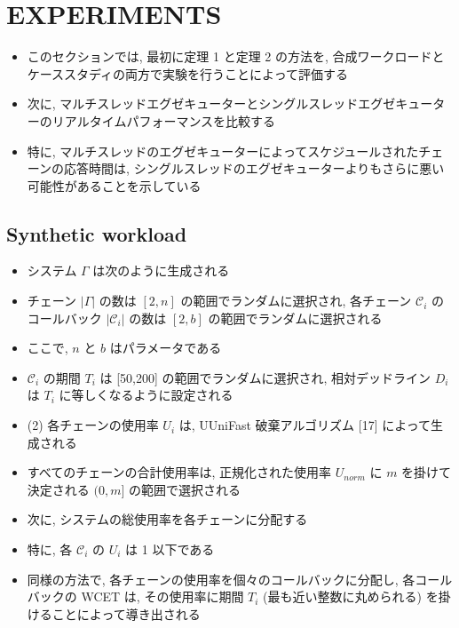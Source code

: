 
\section{EXPERIMENTS}
\label{sec: experiments}


\begin{frame}{}
    \begin{itemize}
        \item このセクションでは, 最初に定理 1 と定理 2 の方法を, 合成ワークロードとケーススタディの両方で実験を行うことによって評価する
\item 次に, マルチスレッドエグゼキューターとシングルスレッドエグゼキューターのリアルタイムパフォーマンスを比較する
\item 特に, マルチスレッドのエグゼキューターによってスケジュールされたチェーンの応答時間は, シングルスレッドのエグゼキューターよりもさらに悪い可能性があることを示している
    \end{itemize}
\end{frame}


\subsection{Synthetic workload}
\label{ssec: synthetic workload}

\begin{frame}{}
    \begin{itemize}
        \item システム $\Gamma$ は次のように生成される
\item チェーン $|\Gamma|$ の数は $[2, n]$ の範囲でランダムに選択され, 各チェーン $\mathcal{C}_{i}$ のコールバック $\left|\mathcal{C}_{i}\right|$ の数は $[2, b]$ の範囲でランダムに選択される
\item ここで, $n$ と $b$ はパラメータである
\item $\mathcal{C}_{i}$ の期間 $T_{i}$ は [50,200] の範囲でランダムに選択され, 相対デッドライン $D_{i}$ は $T_{i}$ に等しくなるように設定される
\item (2) 各チェーンの使用率 $U_{i}$ は, UUniFast 破棄アルゴリズム [17] によって生成される
\item すべてのチェーンの合計使用率は, 正規化された使用率 $U_{n o r m}$ に $m$ を掛けて決定される $(0, m]$ の範囲で選択される
\item 次に, システムの総使用率を各チェーンに分配する
\item 特に, 各 $\mathcal{C}_{i}$ の $U_{i}$ は 1 以下である
\item 同様の方法で, 各チェーンの使用率を個々のコールバックに分配し, 各コールバックの WCET は, その使用率に期間 $T_{i}$ (最も近い整数に丸められる) を掛けることによって導き出される
    \end{itemize}
\end{frame}


